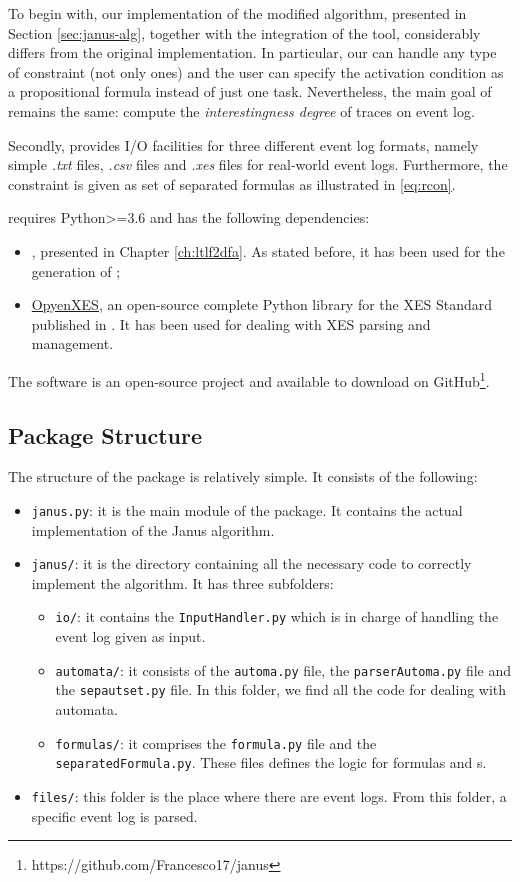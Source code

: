 To begin with, our implementation of the modified algorithm, presented in Section \ref{sec:janus-alg}, together with the integration of the \LTLfToDFA tool, considerably differs from the original implementation. In particular, our \janus can handle any type of constraint (not only \declare ones) and the user can specify the activation condition as a propositional formula instead of just one task. Nevertheless, the main goal of \janus remains the same: compute the \textit{interestingness degree} of traces on event log.  

Secondly, \janus provides I/O facilities for three different event log formats, namely simple \textit{.txt} files, \textit{.csv} files and \textit{.xes} files for real-world event logs. Furthermore, the constraint is given as set of separated formulas as illustrated in \ref{eq:rcon}.

\janus requires Python>=3.6 and has the following dependencies:
\begin{itemize}
\item \LTLfToDFA, presented in Chapter \ref{ch:ltlf2dfa}. As stated before, it has been used for the generation of \DFAs;
\item \href{https://github.com/opyenxes/OpyenXes}{OpyenXES}, an open-source complete Python library for the XES Standard published in \citep{DBLP:conf/bpm/ValdiviesoLMS18}. It has been used for dealing with XES parsing and management.
\end{itemize} 
The \janus software is an open-source project and available to download on GitHub\footnote{https://github.com/Francesco17/janus}.
\subsection{Package Structure}
The structure of the \janus package is relatively simple. It consists of the following:
\begin{itemize}
\item \texttt{janus.py}: it is the main module of the package. It contains the actual implementation of the Janus algorithm.
\item \texttt{janus/}: it is the directory containing all the necessary code to correctly implement the algorithm. It has three subfolders:
\begin{itemize}
\item  \texttt{io/}: it contains the \texttt{InputHandler.py} which is in charge of handling the event log given as input.
\item \texttt{automata/}: it consists of the \texttt{automa.py} file, the \texttt{parserAutoma.py} file and the \texttt{sepautset.py} file. In this folder, we find all the code for dealing with automata.
\item \texttt{formulas/}: it comprises the \texttt{formula.py} file and the \texttt{separatedFormula.py}. These files defines the logic for \LTLp formulas and \rcon s.
\end{itemize}
\item \texttt{files/}: this folder is the place where there are event logs. From this folder, a specific event log is parsed.
\end{itemize}

